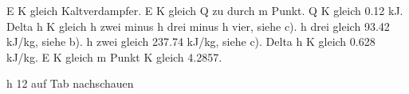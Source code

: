 E K gleich Kaltverdampfer. E K gleich Q zu durch m Punkt. Q K gleich 0.12 kJ. Delta h K gleich h zwei minus h drei minus h vier, siehe c). h drei gleich 93.42 kJ/kg, siehe b). h zwei gleich 237.74 kJ/kg, siehe c). Delta h K gleich 0.628 kJ/kg. E K gleich m Punkt K gleich 4.2857.

h 12 auf Tab nachschauen